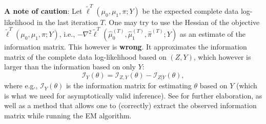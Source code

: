 \begin{enumerate}
		{\color{red} \textbf{A note of caution}:}  Let $\tilde\ell^T(\mu_0, \mu_1, \pi; Y)$ be the expected complete data log-likelihood in the last iteration $T$. One may try to use the Hessian of the objective $\tilde\ell^T(\mu_0, \mu_1, \pi; Y)$, i.e., $-\nabla^2 \tilde\ell^T(\hat{\mu}^{(T)}_0, \hat{\mu}^{(T)}_1, \hat{\pi}^{(T)}; Y)$ as an estimate of the information matrix. This however is \textbf{wrong}. It approximates the information matrix of the complete data log-likelihood based on $(Z,Y)$, which however is larger than the information based on only $Y$:
		$$ \mathcal{I}_Y(\theta) = \mathcal{I}_{Z,Y}(\theta) - \mathcal{I}_{Z | Y}(\theta),$$
		where e.g., $\mathcal{I}_Y(\theta)$ is the information matrix for estimating $\theta$ based on $Y$ (which is what we need for asymptotically valid inference). See \citet{louis1982finding} for further elaboration, as well as a method that allows one to (correctly) extract the observed information matrix while running the EM algorithm.
\end{enumerate}